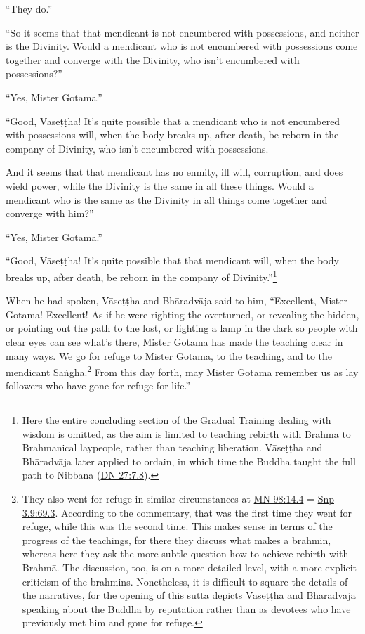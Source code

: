 \documentclass[12pt,openany]{book}%
\begin{document}
“They do.” 

“So it seems that that mendicant is not encumbered with possessions, and neither is the Divinity. Would a mendicant who is not encumbered with possessions come together and converge with the Divinity, who isn’t encumbered with possessions?” 

“Yes, Mister Gotama.” 

“Good, \textsanskrit{Vāseṭṭha}! It’s quite possible that a mendicant who is not encumbered with possessions will, when the body breaks up, after death, be reborn in the company of Divinity, who isn’t encumbered with possessions. 

And it seems that that mendicant has no enmity, ill will, corruption, and does wield power, while the Divinity is the same in all these things. Would a mendicant who is the same as the Divinity in all things come together and converge with him?” 

“Yes, Mister Gotama.” 

“Good, \textsanskrit{Vāseṭṭha}! It’s quite possible that that mendicant will, when the body breaks up, after death, be reborn in the company of Divinity.”\footnote{Here the entire concluding section of the Gradual Training dealing with wisdom is omitted, as the aim is limited to teaching rebirth with \textsanskrit{Brahmā} to Brahmanical laypeople, rather than teaching liberation. \textsanskrit{Vāseṭṭha} and \textsanskrit{Bhāradvāja} later applied to ordain, in which time the Buddha taught the full path to Nibbana (\href{https://suttacentral.net/dn27/en/sujato\#7.8}{DN 27:7.8}). } 

When he had spoken, \textsanskrit{Vāseṭṭha} and \textsanskrit{Bhāradvāja} said to him, “Excellent, Mister Gotama! Excellent! As if he were righting the overturned, or revealing the hidden, or pointing out the path to the lost, or lighting a lamp in the dark so people with clear eyes can see what’s there, Mister Gotama has made the teaching clear in many ways. We go for refuge to Mister Gotama, to the teaching, and to the mendicant \textsanskrit{Saṅgha}.\footnote{They also went for refuge in similar circumstances at \href{https://suttacentral.net/mn98/en/sujato\#14.4}{MN 98:14.4} = \href{https://suttacentral.net/snp3.9/en/sujato\#69.3}{Snp 3.9:69.3}. According to the commentary, that was the first time they went for refuge, while this was the second time. This makes sense in terms of the progress of the teachings, for there they discuss what makes a brahmin, whereas here they ask the more subtle question how to achieve rebirth with \textsanskrit{Brahmā}. The discussion, too, is on a more detailed level, with a more explicit criticism of the brahmins. Nonetheless, it is difficult to square the details of the narratives, for the opening of this sutta depicts \textsanskrit{Vāseṭṭha} and \textsanskrit{Bhāradvāja} speaking about the Buddha by reputation rather than as devotees who have previously met him and gone for refuge. } From this day forth, may Mister Gotama remember us as lay followers who have gone for refuge for life.” 
\end{document}
